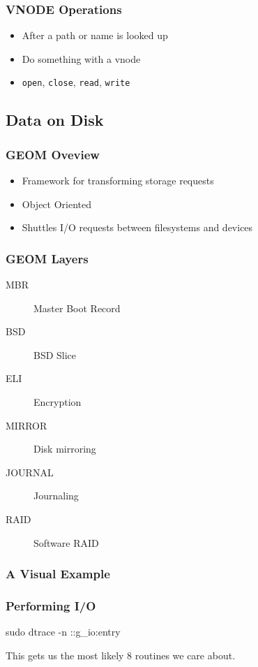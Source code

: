 \documentclass[pdftex]{beamer} %
\begin{document}
\begin{frame}[fragile]
  \frametitle{VNODE Operations}
  \begin{itemize}
  \item After a path or name is looked up
  \item Do something with a vnode
  \item \verb|open|, \verb|close|, \verb|read|, \verb|write|
  \end{itemize}
\end{frame}

\subsection{Data on Disk}
\label{sec:disk}

\begin{frame}
  \frametitle{GEOM Oveview}
  \begin{itemize}
  \item Framework for transforming storage requests
  \item Object Oriented
  \item Shuttles I/O requests between filesystems and devices
  \end{itemize}
\end{frame}

\begin{frame}
  \frametitle{GEOM Layers}
  \begin{description}
  \item[MBR] Master Boot Record
  \item[BSD] BSD Slice
  \item[ELI] Encryption
  \item[MIRROR] Disk mirroring
  \item[JOURNAL] Journaling
  \item[RAID] Software RAID
\end{description}
\end{frame}

\begin{frame}
  \frametitle{A Visual Example}
  
\end{frame}

\begin{frame}
  \frametitle{Performing I/O}
sudo dtrace -n ::g\_io\*:entry  

This gets us the most likely 8 routines we care about.

\end{frame}
\end{document}
